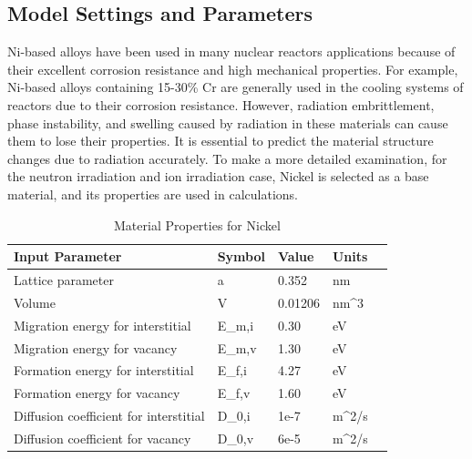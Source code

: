 \documentclass[a4paper]{article}
\begin{document}
\subsection{Model Settings and Parameters} \hspace{10pt}
    Ni-based alloys have been used in many nuclear reactors applications because of their excellent corrosion resistance and high mechanical properties. For example, Ni-based alloys containing 15-30\% Cr are generally used in the cooling systems of reactors due to their corrosion resistance. However, radiation embrittlement, phase instability, and swelling caused by radiation in these materials can cause them to lose their properties. It is essential to predict the material structure changes due to radiation accurately.
    To make a more detailed examination, for the neutron irradiation and ion irradiation case, Nickel is selected as a base material, and its properties are used in calculations.




\begin{table}[h!]
  \centering
  \caption{Material Properties for Nickel\cite{walgraef1996}}
  \label{table:Ni_material_properties}
  \begin{tabular}{ ||p{5.5cm}|p{2cm}|p{2cm}||p{2cm}|p{2cm}||  }
     \hline
     Input Parameter & Symbol & Value & Units\\
     \hline\hline

    Lattice parameter & a  & 0.352  & nm\\
    Volume & V  & 0.01206 & nm^3 \\
    Migration energy for interstitial & E_{m,i}  & 0.30 & eV \\
    Migration energy for vacancy & E_{m,v}  & 1.30 & eV \\
    Formation energy for interstitial & E_{f,i}  & 4.27 & eV \\
    Formation energy for vacancy & E_{f,v}  & 1.60 & eV  \\
    Diffusion coefficient for interstitial & D_{0,i}  & 1e-7 & m^2/s  \\
    Diffusion coefficient for vacancy & D_{0,v}  & 6e-5 & m^2/s  \\

     \hline
  \end{tabular}
\end{table}
\end{document}
